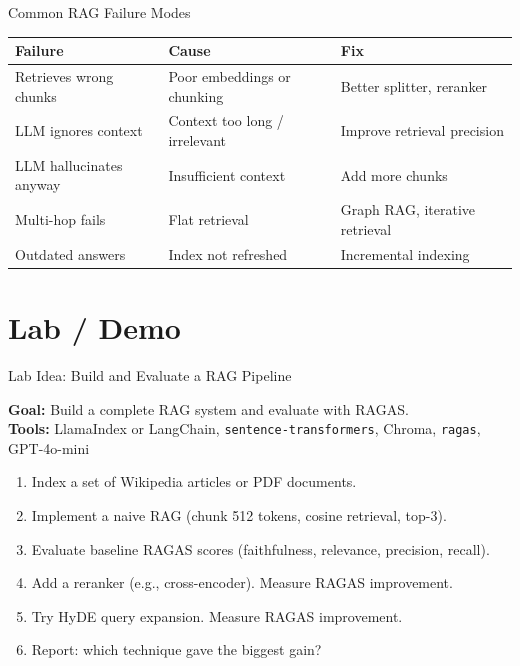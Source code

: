 \documentclass[aspectratio=169,10pt]{beamer}
\begin{document}
\begin{frame}{Common RAG Failure Modes}
  \begin{center}
  \begin{tabular}{lll}
    \toprule
    \textbf{Failure} & \textbf{Cause} & \textbf{Fix} \\
    \midrule
    Retrieves wrong chunks & Poor embeddings or chunking & Better splitter, reranker \\
    LLM ignores context & Context too long / irrelevant & Improve retrieval precision \\
    LLM hallucinates anyway & Insufficient context & Add more chunks \\
    Multi-hop fails & Flat retrieval & Graph RAG, iterative retrieval \\
    Outdated answers & Index not refreshed & Incremental indexing \\
    \bottomrule
  \end{tabular}
  \end{center}
\end{frame}

\section{Lab / Demo}
\begin{frame}{Lab Idea: Build and Evaluate a RAG Pipeline}
  \begin{tcolorbox}[hitbox, title=Lab 6 — End-to-End RAG]
    \textbf{Goal:} Build a complete RAG system and evaluate with RAGAS.\\[4pt]
    \textbf{Tools:} LlamaIndex or LangChain, \texttt{sentence-transformers}, Chroma, \texttt{ragas}, GPT-4o-mini
    \begin{enumerate}
      \item Index a set of Wikipedia articles or PDF documents.
      \item Implement a naive RAG (chunk 512 tokens, cosine retrieval, top-3).
      \item Evaluate baseline RAGAS scores (faithfulness, relevance, precision, recall).
      \item Add a reranker (e.g., cross-encoder). Measure RAGAS improvement.
      \item Try HyDE query expansion. Measure RAGAS improvement.
      \item Report: which technique gave the biggest gain?
    \end{enumerate}
  \end{tcolorbox}
\end{frame}
\end{document}
